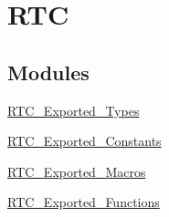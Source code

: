 \hypertarget{group__RTC}{
\section{RTC}
\label{group__RTC}
}
\subsection*{Modules}
\begin{DoxyCompactItemize}
\item 
\hyperlink{group__RTC__Exported__Types}{RTC\_\-Exported\_\-Types}
\item 
\hyperlink{group__RTC__Exported__Constants}{RTC\_\-Exported\_\-Constants}
\item 
\hyperlink{group__RTC__Exported__Macros}{RTC\_\-Exported\_\-Macros}
\item 
\hyperlink{group__RTC__Exported__Functions}{RTC\_\-Exported\_\-Functions}
\end{DoxyCompactItemize}
